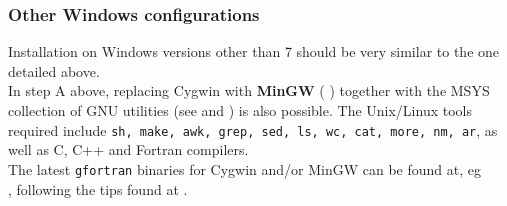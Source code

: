 \documentclass[12pt,twoside]{article}
\begin{document}
\subsubsection{Other Windows configurations}
\label{sec:windows_other}
Installation on Windows versions other than 7 should be very similar to the one detailed above.\\
In step A above, replacing Cygwin with {\bf MinGW} (%
%
) together with the MSYS collection of GNU utilities 
(see 
and
) is also possible.
The Unix/Linux tools required include \texttt{sh, make, awk, grep, sed, ls, wc, cat, more, nm, ar},
as well as C, C++ and Fortran compilers.\\
The latest \texttt{gfortran} binaries for Cygwin and/or MinGW can be found at, eg
\hfill \\
,
following the tips found at 
.
\end{document}
